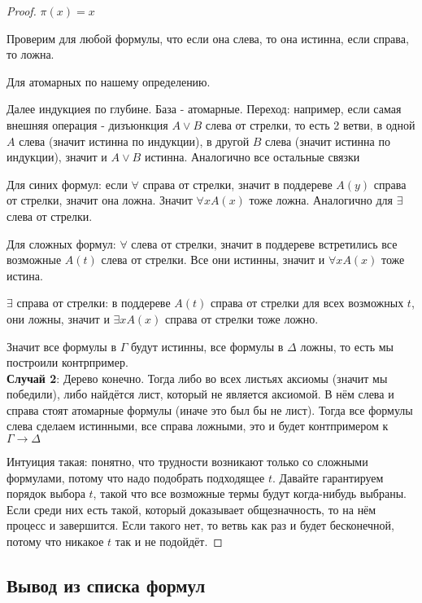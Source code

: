 \begin{proof}
    $\pi(x) = x$

    Проверим для любой формулы, что если она слева, то она истинна, если справа, то ложна.

    Для атомарных по нашему определению.

    Далее индукциея по глубине. База - атомарные. Переход: например, если самая внешняя операция - дизъюнкция $A \lor B$ слева от стрелки, 
    то есть 2 ветви, в одной $A$ слева (значит истинна по индукции), в другой $B$ слева (значит истинна по индукции), значит и $A \lor B$ истинна. 
    Аналогично все остальные связки

    Для синих формул: если $\forall$ справа от стрелки, значит в поддереве $A(y)$ справа от стрелки, значит она ложна. Значит $\forall x A(x)$ тоже ложна. 
    Аналогично для $\exists$ слева от стрелки.

    Для сложных формул: $\forall$ слева от стрелки, значит в поддереве встретились все возможные $A(t)$ слева от стрелки. Все они истинны, значит и $\forall x A(x)$ тоже истина.
    
    $\exists$ справа от стрелки: в поддереве $A(t)$ справа от стрелки для всех возможных $t$, они ложны, значит и $\exists x A(x)$ справа от стрелки тоже ложно.
    
    Значит все формулы в $\Gamma$ будут истинны, все формулы в $\Delta$ ложны, то есть мы построили контрпример.\\

    \textbf{Случай 2}: Дерево конечно. Тогда либо во всех листьях аксиомы (значит мы победили), либо найдётся лист, который не является аксиомой.
    В нём слева и справа стоят атомарные формулы (иначе это был бы не лист). Тогда все формулы слева сделаем истинными, все справа ложными, это и будет контпримером к $\Gamma \to \Delta$

    Интуиция такая: понятно, что трудности возникают только со сложными формулами, потому что надо подобрать подходящее $t$. 
    Давайте гарантируем порядок выбора $t$, такой что все возможные термы будут когда-нибудь выбраны. Если среди них есть такой, который 
    доказывает общезначность, то на нём процесс и завершится. Если такого нет, то ветвь как раз и будет бесконечной, потому что никакое $t$ так и не подойдёт.

\end{proof}

\subsection{Вывод из списка формул}

